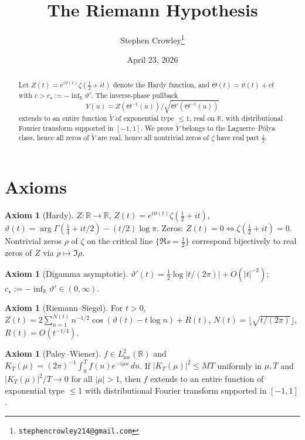 \documentclass[11pt]{article}
\title{The Riemann Hypothesis}
\author{Stephen Crowley\thanks{\texttt{stephencrowley214@gmail.com}}}
\date{April 23, 2026}
\theoremstyle{definition}
\newtheorem{axiom}[theorem]{Axiom}
\newcommand{\R}{\mathbb{R}}
\begin{document}
\maketitle

\begin{abstract}
Let \(Z(t)=e^{i\vartheta(t)}\zeta(\tfrac12+it)\) denote the Hardy function, and \(\Theta(t)=\vartheta(t)+ct\) with \(c>c_\star:=-\inf_\R\vartheta'\). The inverse-phase pullback
\[
Y(u)=Z(\Theta^{-1}(u))/\sqrt{\Theta'(\Theta^{-1}(u))}
\]
extends to an entire function \(\tilde Y\) of exponential type \(\le 1\), real on \(\R\), with distributional Fourier transform supported in \([-1,1]\). We prove \(\tilde Y\) belongs to the Laguerre--P\'olya class, hence all zeros of \(\tilde Y\) are real, hence all nontrivial zeros of \(\zeta\) have real part \(\tfrac12\).
\end{abstract}

\section{Axioms}

\begin{axiom}[Hardy]\label{ax:hardy}
\(Z:\R\to\R\), \(Z(t)=e^{i\vartheta(t)}\zeta(\tfrac12+it)\), \(\vartheta(t)=\arg\Gamma(\tfrac14+it/2)-(t/2)\log\pi\). Zeros: \(Z(t)=0\iff\zeta(\tfrac12+it)=0\). Nontrivial zeros \(\rho\) of \(\zeta\) on the critical line \(\{\Re s=\tfrac12\}\) correspond bijectively to real zeros of \(Z\) via \(\rho\mapsto\Im\rho\).
\end{axiom}

\begin{axiom}[Digamma asymptotic]\label{ax:digamma}
\(\vartheta'(t)=\tfrac12\log|t/(2\pi)|+O(|t|^{-2})\); \(c_\star:=-\inf_\R\vartheta'\in(0,\infty)\).
\end{axiom}

\begin{axiom}[Riemann--Siegel]\label{ax:RS}
For \(t>0\), \(Z(t)=2\sum_{n=1}^{N(t)}n^{-1/2}\cos(\vartheta(t)-t\log n)+R(t)\), \(N(t)=\lfloor\sqrt{t/(2\pi)}\rfloor\), \(R(t)=O(t^{-1/4})\).
\end{axiom}

\begin{axiom}[Paley--Wiener]\label{ax:PW}
\(f\in L^2_{\mathrm{loc}}(\R)\) and \(K_T(\mu)=(2\pi)^{-1}\int_0^T f(u)e^{-i\mu u}\,du\). If \(|K_T(\mu)|^2\le MT\) uniformly in \(\mu,T\) and \(|K_T(\mu)|^2/T\to 0\) for all \(|\mu|>1\), then \(f\) extends to an entire function of exponential type \(\le 1\) with distributional Fourier transform supported in \([-1,1]\).
\end{axiom}
\end{document}
